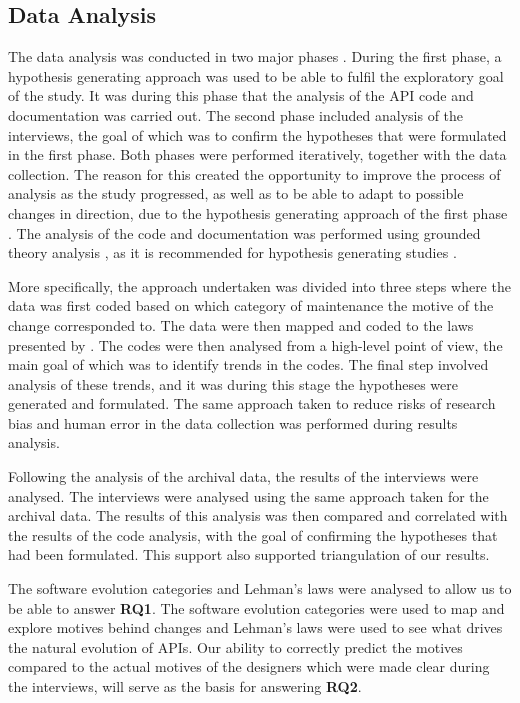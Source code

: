 \documentclass{sig-alternate}
\begin{document}
\subsection{Data Analysis} \label{data_analysis}
The data analysis was conducted in two major phases \cite{andersson2007spiral}. During the first phase, a hypothesis generating approach \cite{seaman1999qualitative} was used to be able to fulfil the exploratory goal of the study. It was during this phase that the analysis of the API code and documentation was carried out. The second phase included analysis of the interviews, the goal of which was to confirm the hypotheses \cite{seaman1999qualitative} that were formulated in the first phase. Both phases were performed iteratively, together with the data collection. The reason for this created the opportunity to improve the process of analysis as the study progressed, as well as to be able to adapt to possible changes in direction, due to the hypothesis generating approach of the first phase \cite{andersson2007spiral}. The analysis of the code and documentation was performed using grounded theory analysis \cite{seaman1999qualitative}, as it is recommended for hypothesis generating studies \cite{runeson2009guidelines} \cite{seaman1999qualitative}.

More specifically, the approach undertaken was divided into three steps where the data was first coded based on which category of maintenance \cite{chapin2001types} the motive of the change corresponded to. The data were then mapped and coded to the laws presented by \cite{lehman1980programs}. The codes were then analysed from a high-level point of view, the main goal of which was to identify trends in the codes. The final step involved analysis of these trends, and it was during this stage the hypotheses were generated and formulated. The same approach taken to reduce risks of research bias and human error in the data collection was performed during results analysis. 

Following the analysis of the archival data, the results of the interviews were analysed. The interviews were analysed using the same approach taken for the archival data. The results of this analysis was then compared and correlated with the results of the code analysis, with the goal of confirming the hypotheses that had been formulated. This support also supported triangulation of our results. 

The software evolution categories \cite{chapin2001types} and Lehman's laws \cite{lehman1980programs} were analysed to allow us to be able to answer \textbf{RQ1}. The software evolution categories were used to map and explore motives behind changes and Lehman's laws were used to see what drives the natural evolution of APIs. Our ability to correctly predict the motives compared to the actual motives of the designers which were made clear during the interviews, will serve as the basis for answering \textbf{RQ2}.
\end{document}
